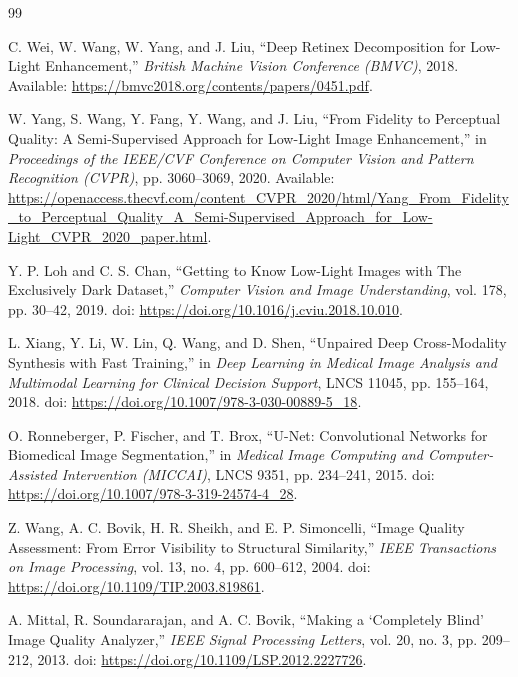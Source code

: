 \documentclass[10pt,twocolumn]{article}
\begin{document}
\begin{thebibliography}{99}

C. Wei, W. Wang, W. Yang, and J. Liu,
\newblock ``Deep Retinex Decomposition for Low-Light Enhancement,''
\newblock \emph{British Machine Vision Conference (BMVC)}, 2018.
\newblock Available: \url{https://bmvc2018.org/contents/papers/0451.pdf}.

W. Yang, S. Wang, Y. Fang, Y. Wang, and J. Liu,
\newblock ``From Fidelity to Perceptual Quality: A Semi-Supervised Approach for Low-Light Image Enhancement,''
\newblock in \emph{Proceedings of the IEEE/CVF Conference on Computer Vision and Pattern Recognition (CVPR)}, pp. 3060--3069, 2020.
\newblock Available: \url{https://openaccess.thecvf.com/content_CVPR_2020/html/Yang_From_Fidelity_to_Perceptual_Quality_A_Semi-Supervised_Approach_for_Low-Light_CVPR_2020_paper.html}.

Y. P. Loh and C. S. Chan,
\newblock ``Getting to Know Low-Light Images with The Exclusively Dark Dataset,''
\newblock \emph{Computer Vision and Image Understanding}, vol. 178, pp. 30--42, 2019.
\newblock doi: \url{https://doi.org/10.1016/j.cviu.2018.10.010}.

L. Xiang, Y. Li, W. Lin, Q. Wang, and D. Shen,
\newblock ``Unpaired Deep Cross-Modality Synthesis with Fast Training,''
\newblock in \emph{Deep Learning in Medical Image Analysis and Multimodal Learning for Clinical Decision Support}, LNCS 11045, pp. 155--164, 2018.
\newblock doi: \url{https://doi.org/10.1007/978-3-030-00889-5_18}.

O. Ronneberger, P. Fischer, and T. Brox,
\newblock ``U-Net: Convolutional Networks for Biomedical Image Segmentation,''
\newblock in \emph{Medical Image Computing and Computer-Assisted Intervention (MICCAI)}, LNCS 9351, pp. 234--241, 2015.
\newblock doi: \url{https://doi.org/10.1007/978-3-319-24574-4_28}.

Z. Wang, A. C. Bovik, H. R. Sheikh, and E. P. Simoncelli,
\newblock ``Image Quality Assessment: From Error Visibility to Structural Similarity,''
\newblock \emph{IEEE Transactions on Image Processing}, vol. 13, no. 4, pp. 600--612, 2004.
\newblock doi: \url{https://doi.org/10.1109/TIP.2003.819861}.

A. Mittal, R. Soundararajan, and A. C. Bovik,
\newblock ``Making a `Completely Blind' Image Quality Analyzer,''
\newblock \emph{IEEE Signal Processing Letters}, vol. 20, no. 3, pp. 209--212, 2013.
\newblock doi: \url{https://doi.org/10.1109/LSP.2012.2227726}.


\end{thebibliography}
\end{document}
